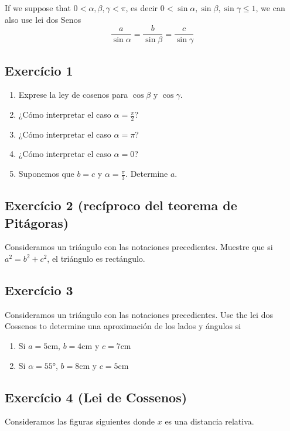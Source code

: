 If we suppose that
$0 < \alpha, \beta, \gamma < \pi$, es decir
$0 < \sin \alpha, \sin \beta, \sin \gamma \leq 1$, we can also use lei dos Senos
$$
\frac{a}{\sin \alpha} = \frac{b}{\sin \beta} =  \frac{c}{\sin \gamma}
$$

\subsection{Exercício 1}

\begin{enumerate}
\item Exprese la ley de cosenos para $\cos \beta$ y $\cos \gamma$.
\item ¿Cómo interpretar el caso $\alpha = \frac{\pi}{2}$?
\item ¿Cómo interpretar el caso $\alpha = \pi$?
\item ¿Cómo interpretar el caso $\alpha = 0$?
\item Suponemos que $b = c$ y $\alpha = \frac{\pi}{3}$. Determine $a$.
\end{enumerate}

\subsection{Exercício 2 (recíproco del teorema de Pitágoras)}

Consideramos un triángulo con las notaciones precedientes.
Muestre que si $a^2 = b^2 + c^2$, el triángulo es rectángulo.

\subsection{Exercício 3}

Consideramos un triángulo con las notaciones precedientes.
Use the lei dos Cossenos to determine una
aproximación de los lados y ángulos si

\begin{enumerate}
  \item Si $a=5\text{cm}$, $b=4\text{cm}$ y $c=7\text{cm}$
  \item Si $\alpha=55°$, $b=8\text{cm}$ y $c=5\text{cm}$
\end{enumerate}

\subsection{Exercício 4 (Lei de Cossenos)}

Consideramos las figuras siguientes donde $x$ es una distancia relativa.

